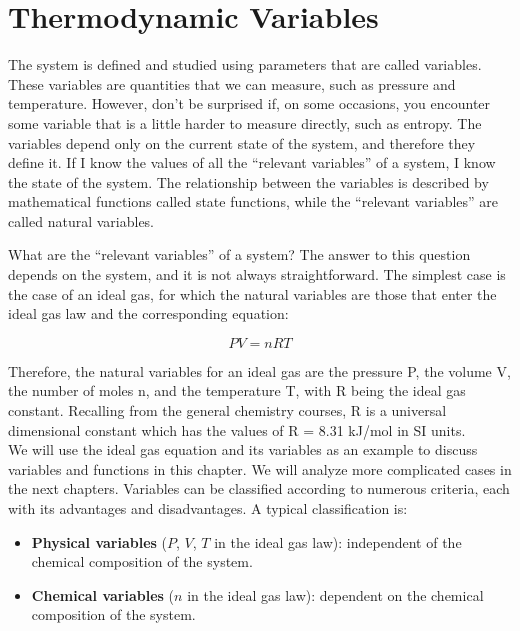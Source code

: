 \documentclass[
  9pt,
]{extbook}
\providecommand{\tightlist}{%
  \setlength{\itemsep}{0pt}\setlength{\parskip}{0pt}}
\theoremstyle{definition}
\theoremstyle{definition}
\theoremstyle{definition}
\theoremstyle{remark}
\begin{document}
\hypertarget{thermodynamic-variables}{%
\section{Thermodynamic Variables}\label{thermodynamic-variables}}

The system is defined and studied using parameters that are called variables. These variables are quantities that we can measure, such as pressure and temperature. However, don't be surprised if, on some occasions, you encounter some variable that is a little harder to measure directly, such as entropy. The variables depend only on the current state of the system, and therefore they define it. If I know the values of all the ``relevant variables'' of a system, I know the state of the system. The relationship between the variables is described by mathematical functions called state functions, while the ``relevant variables'' are called natural variables.

What are the ``relevant variables'' of a system? The answer to this question depends on the system, and it is not always straightforward. The simplest case is the case of an ideal gas, for which the natural variables are those that enter the ideal gas law and the corresponding equation:

\begin{equation}
  PV=nRT       
  \label{eq:idealgaslaworiginal}
\end{equation}

Therefore, the natural variables for an ideal gas are the pressure P, the volume V, the number of moles n, and the temperature T, with R being the ideal gas constant. Recalling from the general chemistry courses, R is a universal dimensional constant which has the values of R = 8.31 kJ/mol in SI units.\\
We will use the ideal gas equation and its variables as an example to discuss variables and functions in this chapter. We will analyze more complicated cases in the next chapters.
Variables can be classified according to numerous criteria, each with its advantages and disadvantages. A typical classification is:

\begin{itemize}
\tightlist
\item
  \textbf{Physical variables} (\(P\), \(V\), \(T\) in the ideal gas law): independent of the chemical composition of the system.
\item
  \textbf{Chemical variables} (\(n\) in the ideal gas law): dependent on the chemical composition of the system.
\end{itemize}
\end{document}
